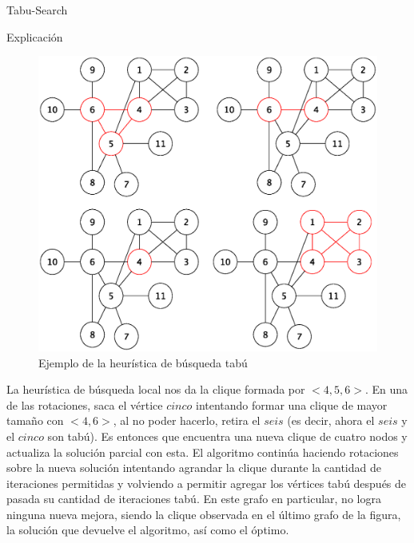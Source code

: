 \begin{section}{Tabu-Search}
\begin{subsection}{Explicación}
			\begin{figure}[H]
				\centering
		    	\includegraphics[scale=0.5]{tabu_search/seguimiento.eps}
			    \caption{Ejemplo de la heurística de búsqueda tabú}
			    \label{fig:seguimiento_busqueda_tabu}
			\end{figure}

		La heurística de búsqueda local nos da la clique formada por $<4,5,6>$. En una de las rotaciones, saca el vértice $cinco$ intentando formar una clique de mayor tamaño con $<4,6>$, al no poder hacerlo, retira el $seis$ (es decir, ahora el $seis$ y el $cinco$ son tabú). Es entonces que encuentra una nueva clique de cuatro nodos y actualiza la solución parcial con esta. El algoritmo continúa haciendo rotaciones sobre la nueva solución intentando agrandar la clique durante la cantidad de iteraciones permitidas y volviendo a permitir agregar los vértices tabú después de pasada su cantidad de iteraciones tabú. En este grafo en particular, no logra ninguna nueva mejora, siendo la clique observada en el último grafo de la figura, la solución que devuelve el algoritmo, así como el óptimo.

\end{subsection}
\end{section}
